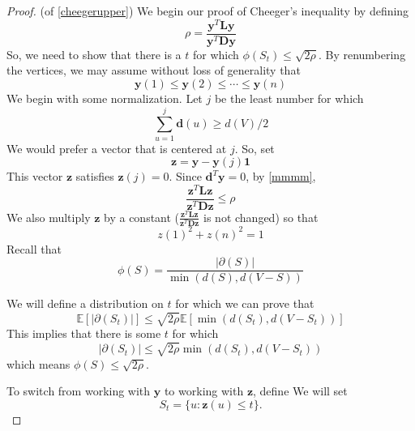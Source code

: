 \documentclass{article}
\begin{document}
\begin{proof}(of \cref{cheegerupper})
We begin our proof of Cheeger's inequality by defining
$$
\rho=\frac{\boldsymbol{y}^{T} \boldsymbol{L} \boldsymbol{y}}{\boldsymbol{y}^{T} \boldsymbol{D} \boldsymbol{y}}
$$
So, we need to show that there is a $t$ for which $\phi\left(S_{t}\right) \leq \sqrt{2 \rho}$.
By renumbering the vertices, we may assume without loss of generality that
$$
\boldsymbol{y}(1) \leq \boldsymbol{y}(2) \leq \cdots \leq \boldsymbol{y}(n)
$$
We begin with some normalization. Let $j$ be the least number for which
$$
\sum_{u=1}^{j} \boldsymbol{d}(u) \geq d(V) / 2
$$
We would prefer a vector that is centered at $j .$ So, set
$$
\boldsymbol{z}=\boldsymbol{y}-\boldsymbol{y}(j) \mathbf{1}
$$
This vector $\boldsymbol{z}$ satisfies $\boldsymbol{z}(j)=0$. Since $\boldsymbol{d}^T\boldsymbol{y}=0$, by \cref{mmmm},
$$
\frac{\boldsymbol{z}^{T} \boldsymbol{L} \boldsymbol{z}}{\boldsymbol{z}^{T} \boldsymbol{D} \boldsymbol{z}} \leq \rho
$$
We also multiply $\boldsymbol{z}$ by a constant ($\frac{\boldsymbol{z}^{T} \boldsymbol{L} \boldsymbol{z}}{\boldsymbol{z}^{T} \boldsymbol{D} \boldsymbol{z}}$ is not changed) so that
$$
z(1)^{2}+z(n)^{2}=1
$$
Recall that
$$
\phi(S)=\frac{|\partial(S)|}{\min (d(S), d(V-S))}
$$

We will define a distribution on $t$ for which we can prove that
$$
\mathbb{E}\left[\left|\partial\left(S_{t}\right)\right|\right] \leq \sqrt{2 \rho} \mathbb{E}\left[\min \left(d\left(S_{t}\right), d\left(V-S_{t}\right)\right)\right]
$$
This implies that there is some $t$ for which
$$
\left|\partial\left(S_{t}\right)\right| \leq \sqrt{2 \rho} \min \left(d\left(S_{t}\right), d\left(V-S_{t}\right)\right)
$$
which means $\phi(S) \leq \sqrt{2 \rho}$.


To switch from working with $\boldsymbol{y}$ to working with $\boldsymbol{z}$, define We will set $$S_{t}=\{u: \boldsymbol{z}(u) \leq t\}.$$ 


\end{proof}
\end{document}
